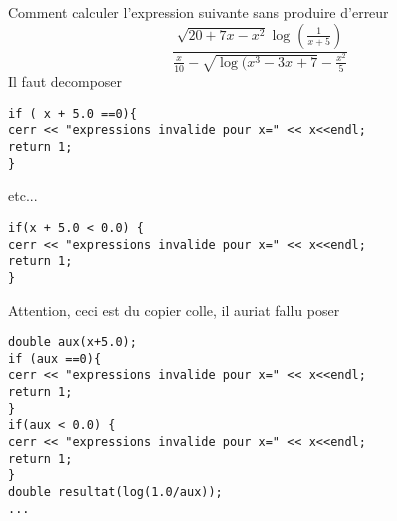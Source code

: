 \documentclass[../main.tex]{subfiles}
\begin{document}
Comment calculer l'expression suivante sans produire d'erreur 
\[ 
	\frac{ \sqrt{20+7x -x^{2}} \log (  \frac{1}{x+5})}{\frac{x}{10} - \sqrt{\log(x^{3} - 3x + 7} - \frac{x^{2}}{5}}
\]
Il faut decomposer
\begin{lstlisting}
if ( x + 5.0 ==0){
cerr << "expressions invalide pour x=" << x<<endl;
return 1;
}
\end{lstlisting}
etc...
\begin{lstlisting}
if(x + 5.0 < 0.0) { 
cerr << "expressions invalide pour x=" << x<<endl;
return 1;
}
\end{lstlisting}
Attention, ceci est du copier colle, il auriat fallu poser
\begin{lstlisting}
double aux(x+5.0);
if (aux ==0){
cerr << "expressions invalide pour x=" << x<<endl;
return 1;
}
if(aux < 0.0) { 
cerr << "expressions invalide pour x=" << x<<endl;
return 1;
}
double resultat(log(1.0/aux));
...
\end{lstlisting}
\end{document}
